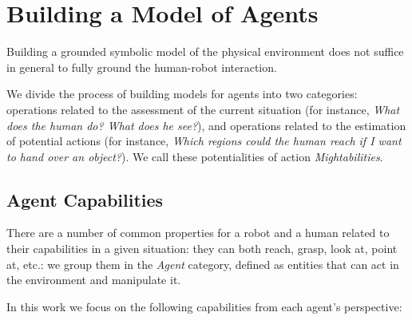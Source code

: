 \documentclass{svmult}
\begin{document}
\section{Building a Model of Agents}
\label{grounding_agents}

Building a grounded symbolic model of the physical environment does not suffice
in general to fully ground the human-robot interaction.

We divide the process of building models for agents into two categories:
operations related to the assessment of the current situation (for instance,
\emph{What does the human do? What does he see?}), and operations related to
the estimation of potential actions (for instance, \emph{Which regions could
the human reach if I want to hand over an object?}). We call these
potentialities of action \emph{Mightabilities}.

\subsection{Agent Capabilities}

There are a number of common properties for a robot and a human related to
their capabilities in a given situation: they can both reach, grasp, look at,
point at, etc.: we group them in the \emph{Agent} category, defined as entities
that can act in the environment and manipulate it.

In this work we focus on the following capabilities from each agent's
perspective:
\end{document}
